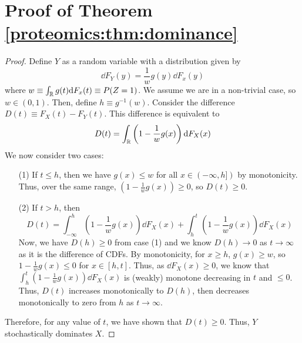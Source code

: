 

\section{Proof of Theorem \ref{proteomics:thm:dominance}}

\begin{proof}
Define $Y$ as a random variable with a distribution given by
%
\begin{equation}
\nonumber
\dd F_Y(y) = \frac{1}{w} g(y) \dd F_x(y)
\end{equation}
%
where $w \equiv \int_{\mathbb{R}} g(t) \mathrm{d} F_x(t) \equiv P(Z=1)$. We assume we are in a non-trivial case, so $w \in (0,1)$.
%
Then, define $h \equiv g^{-1}(w)$. Consider the difference $D(t) \equiv F_X(t) - F_Y(t)$. This difference is equivalent to
%
\begin{equation}
\nonumber
D(t) = \int_{\mathbb{R}} \left(1 - \frac{1}{w}g(x) \right) \mathrm{d} F_X(x)
\end{equation}
%
We now consider two cases:
\begin{enumerate}
\item[(1)] If $t \leq h$, then we have $g(x) \leq w$ for all $x \in (-\infty, h])$ by monotonicity. Thus, over the same range, $\left(1 - \frac{1}{w}g(x) \right) \geq 0$, so $D(t) \geq 0$.

\item[(2)] If $t > h$, then
%
\begin{equation}
\nonumber
D(t) = \int_{-\infty}^h \left(1 - \frac{1}{w}g(x) \right) \dd F_X(x) + 
	\int_{h}^t \left(1 - \frac{1}{w}g(x) \right) \dd F_X(x)
\end{equation}
%
Now, we have $D(h) \geq 0$ from case (1) and we know $D(h) \rightarrow 0$ as $t \rightarrow \infty$ as it is the difference of CDFs. By monotonicity, for $x \geq h$, $g(x) \geq w$, so $1 - \frac{1}{w}g(x) \leq 0$ for $x \in [h,t]$. Thus, as $\dd F_X(x) \geq 0$, we know that $\int_{h}^t \left(1 - \frac{1}{w}g(x)\right) \dd F_X(x)$ is (weakly) monotone decreasing in $t$ and $\leq 0$. Thus, $D(t)$ increases monotonically to $D(h)$, then decreases monotonically to zero from $h$ as $t \rightarrow \infty$.
\end{enumerate}
%
Therefore, for any value of $t$, we have shown that $D(t) \geq 0$. Thus, $Y$ stochastically dominates $X$.

\end{proof}
